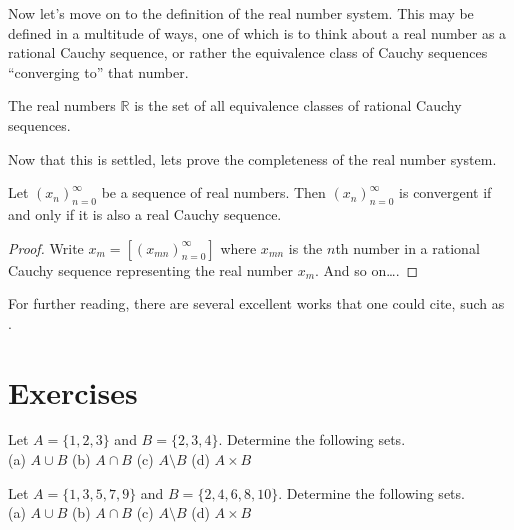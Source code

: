 \documentclass{tstextbook}
\begin{document}
    Now let's move on to the definition of the real number system. This
    may be defined in a multitude of ways, one of which is to think about
    a real number as a rational Cauchy sequence, or rather the equivalence
    class of Cauchy sequences ``converging to'' that number.

    \begin{definition}
        \label{def:realnumbers}
        The real numbers $\mathbb{R}$ is the set of all equivalence classes
        of rational Cauchy sequences.
    \end{definition}

    Now that this is settled, lets prove the completeness of the real
    number system.

    \begin{theorem}
        \label{th:realnumberscomplete}
        Let $(x_n)_{n=0}^{\infty}$ be a sequence of real numbers.
        Then $(x_n)_{n=0}^{\infty}$ is convergent if and only if
        it is also a real Cauchy sequence.
    \end{theorem}
    \begin{proof}
        Write $x_m = [(x_{mn})_{n=0}^{\infty}]$ where
        $x_{mn}$ is the $n$th number in a rational Cauchy sequence
        representing the real number $x_m$. And so on\ldots.
    \end{proof}

    For further reading, there are several excellent works that one could
    cite, such as \cite{Tao2006,Turing1936}.

    \section*{Exercises}

    \begin{exercise}
        Let $A = \{1, 2, 3\}$ and $B = \{2, 3, 4\}$.
        Determine the following sets. \\
        (a) $A \cup B$ \quad
        (b) $A \cap B$ \quad
        (c) $A \setminus B$ \quad
        (d) $A \times B$
    \end{exercise}

    \begin{exercise}
        Let $A = \{1, 3, 5, 7, 9\}$ and $B = \{2, 4, 6, 8, 10\}$.
        Determine the following sets. \\
        (a) $A \cup B$ \quad
        (b) $A \cap B$ \quad
        (c) $A \setminus B$ \quad
        (d) $A \times B$
    \end{exercise}
\end{document}
